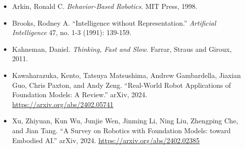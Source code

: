 \documentclass[11pt]{article}
\begin{document}
\begin{itemize}
\item Arkin, Ronald C. \textit{Behavior-Based Robotics}. MIT Press, 1998.
\item Brooks, Rodney A. ``Intelligence without Representation.'' \textit{Artificial Intelligence} 47, no. 1-3 (1991): 139-159.
\item Kahneman, Daniel. \textit{Thinking, Fast and Slow}. Farrar, Straus and Giroux, 2011.
\item Kawaharazuka, Kento, Tatsuya Matsushima, Andrew Gambardella, Jiaxian Guo, Chris Paxton, and Andy Zeng. ``Real-World Robot Applications of Foundation Models: A Review.'' arXiv, 2024. \url{https://arxiv.org/abs/2402.05741}
\item Xu, Zhiyuan, Kun Wu, Junjie Wen, Jinming Li, Ning Liu, Zhengping Che, and Jian Tang. ``A Survey on Robotics with Foundation Models: toward Embodied AI.'' arXiv, 2024. \url{https://arxiv.org/abs/2402.02385}
\end{itemize}
\end{document}
